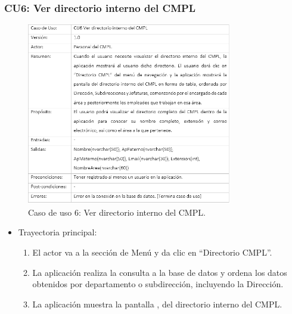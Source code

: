 		\subsubsection{CU6: Ver directorio interno del CMPL}
			\begin{figure}[htbp!]
				\centering
					\includegraphics[width=0.8\textwidth]{images/CU/CU6}
					\caption{Caso de uso 6: Ver directorio interno del CMPL.}
				\label{Tabla}
			\end{figure}
			
			\begin{itemize}
				\item Trayectoria principal:
					\begin{enumerate}
						\item El actor va a la sección de Menú y da clic en ``Directorio CMPL''.
						\item La aplicación realiza la consulta a la base de datos y ordena los datos obtenidos por departamento o subdirección, incluyendo la Dirección.
						\item La aplicación muestra la pantalla , del directorio interno del CMPL.
					\end{enumerate}
			\end{itemize}
			
